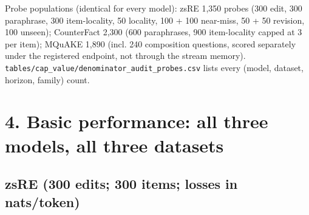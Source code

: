 \documentclass[10pt,a4paper]{article}
\begin{document}
Probe populations (identical for every model): zsRE 1,350 probes (300 edit, 300 paraphrase, 300 item-locality, 50 locality, 100 + 100 near-miss, 50 + 50 revision, 100 unseen); CounterFact 2,300 (600 paraphrases, 900 item-locality capped at 3 per item); MQuAKE 1,890 (incl. 240 composition questions, scored separately under the registered endpoint, not through the stream memory). \texttt{tables/cap\_value/denominator\_audit\_probes.csv} lists every (model, dataset, horizon, family) count.



\section*{4. Basic performance: all three models, all three datasets}



\subsection*{zsRE (300 edits; 300 items; losses in nats/token)}
\end{document}
